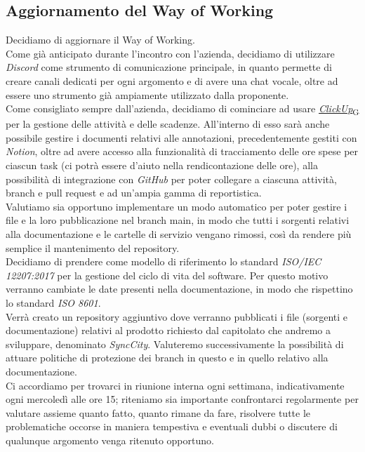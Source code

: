 \documentclass[italian,12pt]{article}
\begin{document}
\subsection{Aggiornamento del Way of Working}
Decidiamo di aggiornare il Way of Working. \\
Come già anticipato durante l'incontro con l'azienda, decidiamo di utilizzare \textit{Discord} come strumento di comunicazione principale, in quanto permette di creare canali dedicati per ogni argomento e di avere una chat vocale, oltre ad essere uno strumento già ampiamente utilizzato dalla proponente. \\
Come consigliato sempre dall'azienda, decidiamo di cominciare ad usare \href{https://7last.github.io/docs/rtb/documentazione-interna/glossario\#clickup}{\textit{ClickUp}\textsubscript{G}} per la gestione delle attività e delle scadenze. All'interno di esso sarà anche possibile gestire i documenti relativi alle annotazioni, precedentemente gestiti con \textit{Notion}, oltre ad avere accesso alla funzionalità di tracciamento delle ore spese per ciascun task (ci potrà essere d'aiuto nella rendicontazione delle ore), alla possibilità di integrazione con \textit{GitHub} per poter collegare a ciascuna attività, branch e pull request e ad un'ampia gamma di reportistica. \\
Valutiamo sia opportuno implementare un modo automatico per poter gestire i file e la loro pubblicazione nel branch main, in modo che tutti i sorgenti relativi alla documentazione e le cartelle di servizio vengano rimossi, così da rendere più semplice il mantenimento del repository. \\
Decidiamo di prendere come modello di riferimento lo standard \textit{ISO/IEC 12207:2017} per la gestione del ciclo di vita del software. Per questo motivo verranno cambiate le date presenti nella documentazione, in modo che rispettino lo standard \textit{ISO 8601}. \\
Verrà creato un repository aggiuntivo dove verranno pubblicati i file (sorgenti e documentazione) relativi al prodotto 
richiesto dal capitolato che andremo a sviluppare, denominato \textit{SyncCity}. Valuteremo successivamente 
la possibilità di attuare politiche di protezione dei branch in questo e in quello relativo alla documentazione. \\
Ci accordiamo per trovarci in riunione interna ogni settimana, indicativamente ogni mercoledì alle ore 15; riteniamo sia importante confrontarci regolarmente per valutare assieme quanto fatto, quanto rimane da fare, risolvere tutte le problematiche occorse in maniera tempestiva e eventuali dubbi o discutere di qualunque argomento venga ritenuto opportuno.
\end{document}
